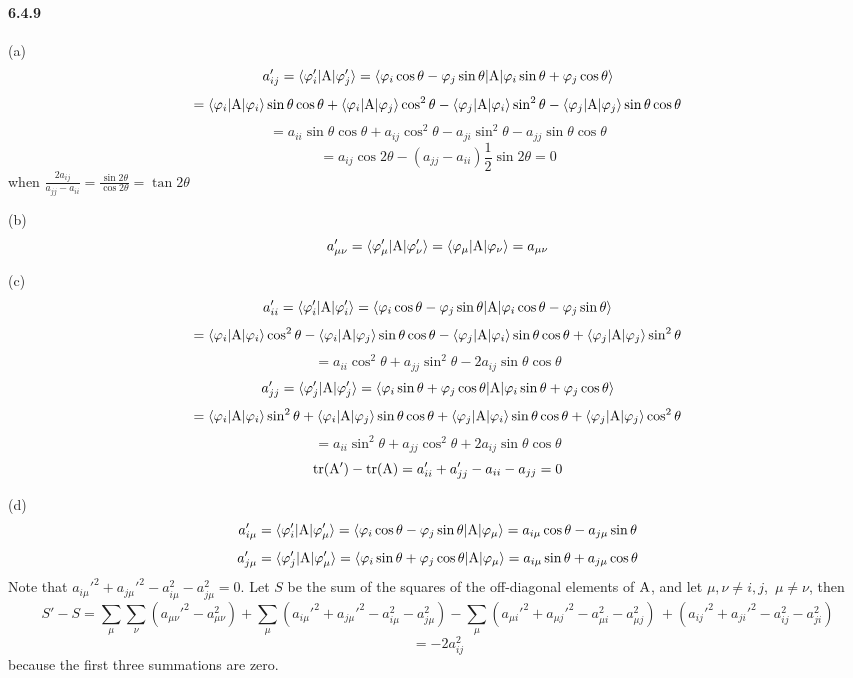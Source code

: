 \documentclass[a4paper]{article}
\begin{document}
\paragraph{6.4.9}
(a) 
\[
a'_{ij}=\langle\varphi'_i|\mathrm{A}|\varphi'_j\rangle=\langle\varphi_i\cos\theta-\varphi_j\sin\theta|\mathrm{A}|\varphi_i\sin\theta+\varphi_j\cos\theta\rangle
\]
\[
=\langle\varphi_i|\mathrm{A}|\varphi_i\rangle\sin\theta\cos\theta+\langle\varphi_i|\mathrm{A}|\varphi_j\rangle\cos^2\theta-\langle\varphi_j|\mathrm{A}|\varphi_i\rangle\sin^2\theta-\langle\varphi_j|\mathrm{A}|\varphi_j\rangle\sin\theta\cos\theta
\]
\[
=a_{ii}\sin\theta\cos\theta+a_{ij}\cos^2\theta-a_{ji}\sin^2\theta-a_{jj}\sin\theta\cos\theta
\]
\[
=a_{ij}\cos2\theta-(a_{jj}-a_{ii})\frac{1}{2}\sin2\theta=0
\]
when $\frac{2a_{ij}}{a_{jj}-a_{ii}}=\frac{\sin2\theta}{\cos2\theta}=\tan2\theta$
\medskip

(b) 
\[
a'_{\mu\nu}=\langle\varphi'_\mu|\mathrm{A}|\varphi'_\nu\rangle=\langle\varphi_\mu|\mathrm{A}|\varphi_\nu\rangle=a_{\mu\nu}
\]

(c) 
\[
a'_{ii}=\langle\varphi'_i|\mathrm{A}|\varphi'_i\rangle=\langle\varphi_i\cos\theta-\varphi_j\sin\theta|\mathrm{A}|\varphi_i\cos\theta-\varphi_j\sin\theta\rangle
\]
\[
=\langle\varphi_i|\mathrm{A}|\varphi_i\rangle\cos^2\theta-\langle\varphi_i|\mathrm{A}|\varphi_j\rangle\sin\theta\cos\theta-\langle\varphi_j|\mathrm{A}|\varphi_i\rangle\sin\theta\cos\theta+\langle\varphi_j|\mathrm{A}|\varphi_j\rangle\sin^2\theta
\]
\[
=a_{ii}\cos^2\theta+a_{jj}\sin^2\theta-2a_{ij}\sin\theta\cos\theta
\]
\[
a'_{jj}=\langle\varphi'_j|\mathrm{A}|\varphi'_j\rangle=\langle\varphi_i\sin\theta+\varphi_j\cos\theta|\mathrm{A}|\varphi_i\sin\theta+\varphi_j\cos\theta\rangle
\]
\[
=\langle\varphi_i|\mathrm{A}|\varphi_i\rangle\sin^2\theta+\langle\varphi_i|\mathrm{A}|\varphi_j\rangle\sin\theta\cos\theta+\langle\varphi_j|\mathrm{A}|\varphi_i\rangle\sin\theta\cos\theta+\langle\varphi_j|\mathrm{A}|\varphi_j\rangle\cos^2\theta
\]
\[
=a_{ii}\sin^2\theta+a_{jj}\cos^2\theta+2a_{ij}\sin\theta\cos\theta
\]
\[
\mathrm{tr}(\mathrm{A'})-\mathrm{tr}(\mathrm{A})=a'_{ii}+a'_{jj}-a_{ii}-a_{jj}=0
\]

(d) 
\[
a'_{i\mu}=\langle\varphi'_i|\mathrm{A}|\varphi'_\mu\rangle=\langle\varphi_i\cos\theta-\varphi_j\sin\theta|\mathrm{A}|\varphi_\mu\rangle=a_{i\mu}\cos\theta-a_{j\mu}\sin\theta
\]
\[
a'_{j\mu}=\langle\varphi'_j|\mathrm{A}|\varphi'_\mu\rangle=\langle\varphi_i\sin\theta+\varphi_j\cos\theta|\mathrm{A}|\varphi_\mu\rangle=a_{i\mu}\sin\theta+a_{j\mu}\cos\theta
\]
Note that $a_{i\mu}'^2+a_{j\mu}'^2-a_{i\mu}^2-a_{j\mu}^2=0$. Let $S$ be the sum of the squares
of the off-diagonal elements of $\mathrm{A}$, and let $\mu,\nu\neq i,j$, \,$\mu\neq\nu$, then
\[
S'-S=\sum_\mu\sum_\nu(a_{\mu\nu}'^2-a_{\mu\nu}^2)+\sum_\mu(a_{i\mu}'^2+a_{j\mu}'^2-a_{i\mu}^2-a_{j\mu}^2)-\sum_\mu(a_{\mu i}'^2+a_{\mu j}'^2-a_{\mu i}^2-a_{\mu j}^2)\,+(a_{ij}'^2+a_{ji}'^2-a_{ij}^2-a_{ji}^2)
\]\[
=-2a_{ij}^2\]
because the first three summations are zero.
\end{document}
